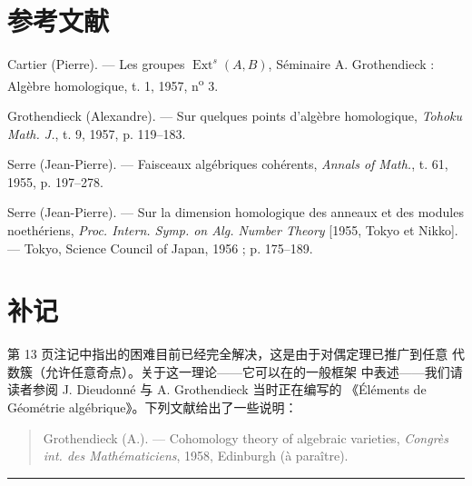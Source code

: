 \section*{参考文献}

\noindent[1] Cartier (Pierre). --- Les groupes
$\operatorname{Ext}^{s}(A,B)$, Séminaire A. Grothendieck : Algèbre homologique,
t. 1, 1957, n\textsuperscript{o} 3.

\noindent[2] Grothendieck (Alexandre). --- Sur quelques points d'algèbre
homologique, \emph{Tohoku Math. J.}, t. 9, 1957, p. 119--183.

\noindent[3] Serre (Jean-Pierre). --- Faisceaux algébriques cohérents,
\emph{Annals of Math.}, t. 61, 1955, p. 197--278.

\noindent[4] Serre (Jean-Pierre). --- Sur la dimension homologique des anneaux
et des modules noethériens, \emph{Proc. Intern. Symp. on Alg. Number Theory}
[1955, Tokyo et Nikko]. --- Tokyo, Science Council of Japan, 1956 ;
p. 175--189.

\clearpage
{}
\section*{补记}

第 13 页注记中指出的困难目前已经完全解决，这是由于对偶定理已推广到任意
代数簇（允许任意奇点）。关于这一理论——它可以在的一般框架
中表述——我们请读者参阅 J. Dieudonné 与 A. Grothendieck 当时正在编写的
《Éléments de Géométrie algébrique》。下列文献给出了一些说明：

\begin{quote}
Grothendieck (A.). --- Cohomology theory of algebraic varieties,
\emph{Congrès int. des Mathématiciens}, 1958, Edinburgh (à paraître).
\end{quote}

\begin{flushright}
[1959年4月]
\end{flushright}

\begin{center}\rule{36mm}{0.5pt}\end{center}
